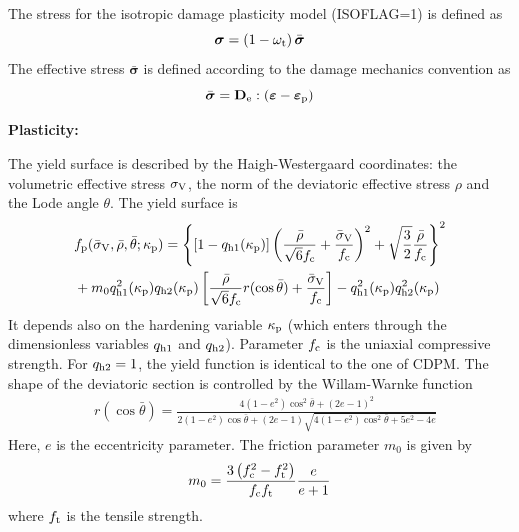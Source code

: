 \documentclass[a4paper]{article}
\begin{document}
The stress for the isotropic damage plasticity model (ISOFLAG=1) is defined as 
\begin{equation}
\boldsymbol{\sigma} = \left(1-\omega_{\rm t}\right) \bar{\boldsymbol{\sigma}}
\end{equation}
The effective stress $\bar{\boldsymbol{\sigma}}$ is defined according to the damage mechanics convention as 
\begin{equation}
\bar{\boldsymbol{\sigma}} = \mathbf{D}_{\rm e} : \left(\boldsymbol{\varepsilon} - \boldsymbol{\varepsilon}_{\rm p}\right) 
\end{equation}

\noindent\textbf{Plasticity:}

The yield surface is described by the Haigh-Westergaard coordinates: the volumetric effective stress $\sigma_{\rm V}$, the norm of the deviatoric effective stress $\rho$ and the Lode angle $\theta$. The yield surface is
\begin{equation} \label{eqcdpm2:yieldSurface}    
\begin{split}
& f_{\rm p}(\bar{\sigma}_{\rm V},\bar\rho,\bar\theta;\kappa_{\rm p})=  \left\{\left[1-q_{\rm{h1}}(\kappa_{\rm p})\right]\left( \frac{\bar{\rho}} {\sqrt{6}f_{\rm c}} + \frac{\bar{\sigma}_{\rm V}} {f_{\rm c}} \right)^2 + \sqrt{\frac{3}{2}} \frac {\bar{\rho}}{f_{\rm c}} \right\}^2 \\
& +m_0 q^2_{\rm{h1}}(\kappa_{\rm p})q_{\rm{h2}}(\kappa_{\rm p}) \left[\frac{\bar{\rho} }{\sqrt{6}f_{\rm c}}r(\cos{\bar{\theta}}) + \frac{\bar{\sigma}_{\rm V}}{f_{\rm c}} \right] - q_{\rm{h1}}^2(\kappa_{\rm p}) q_{{\rm h2}}^2(\kappa_{\rm p})
\end{split}
\end{equation}
It depends also on the hardening variable $\kappa_{\rm p}$ (which enters through the dimensionless variables $q_{\rm h1}$ and $q_{\rm h2}$). Parameter $f_{\rm c}$ is the uniaxial compressive strength. For $q_{\rm h2} = 1$, the yield function is identical to the one of CDPM.
The shape of the deviatoric section is controlled by the Willam-Warnke function
\begin{equation} \label{eq:rFunction}
\begin{split}
&r(\cos{\bar{\theta}}) = \frac{4(1-e^2)\cos^2{\bar{\theta}} + (2e-1)^2}{2(1-e^2)\cos{\bar{\theta}} + (2e-1)\sqrt{4(1-e^2)\cos^2{\bar{\theta}}+5e^2 -4e}} 
\end{split}
\end{equation} 
Here, $e$ is the eccentricity parameter.
The friction parameter $m_0$ is given by 
\begin{equation}\label{eq:frictionM}
m_0 = \dfrac{3 \left(f_{\rm c}^2 - f_{\rm t}^2\right)}{f_{\rm c}f_{\rm t}} \dfrac{e}{e+1}
\end{equation}
where $f_{\rm t}$ is the tensile strength.
\end{document}
